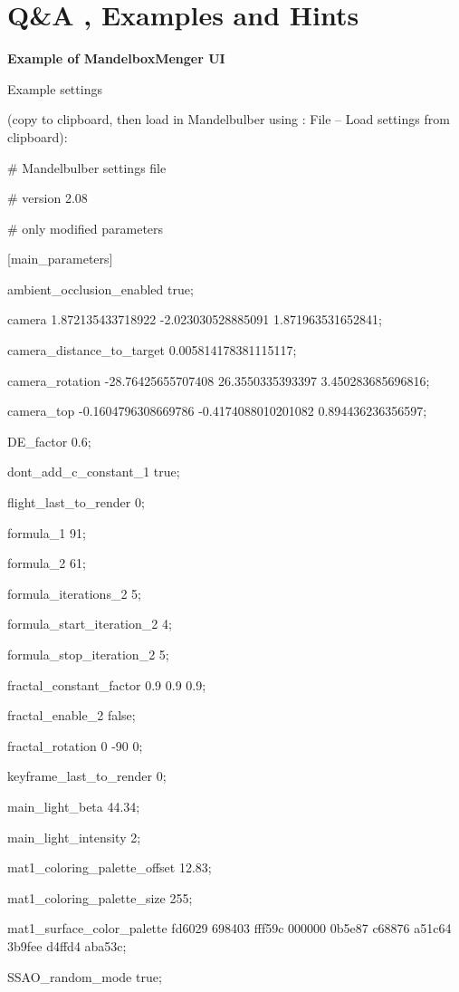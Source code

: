 \section{Q\&A , Examples and Hints}\label{qa-examples-and-hints}

\textbf{Example of MandelboxMenger UI}

Example settings

(copy to clipboard, then load in Mandelbulber using : File -- Load settings from
clipboard):

\# Mandelbulber settings file

\# version 2.08

\# only modified parameters

{[}main\_parameters{]}

ambient\_occlusion\_enabled true;

camera 1.872135433718922 -2.023030528885091 1.871963531652841;

camera\_distance\_to\_target 0.005814178381115117;

camera\_rotation -28.76425655707408 26.3550335393397 3.450283685696816;

camera\_top -0.1604796308669786 -0.4174088010201082 0.894436236356597;

DE\_factor 0.6;

dont\_add\_c\_constant\_1 true;

flight\_last\_to\_render 0;

formula\_1 91;

formula\_2 61;

formula\_iterations\_2 5;

formula\_start\_iteration\_2 4;

formula\_stop\_iteration\_2 5;

fractal\_constant\_factor 0.9 0.9 0.9;

fractal\_enable\_2 false;

fractal\_rotation 0 -90 0;

keyframe\_last\_to\_render 0;

main\_light\_beta 44.34;

main\_light\_intensity 2;

mat1\_coloring\_palette\_offset 12.83;

mat1\_coloring\_palette\_size 255;

mat1\_surface\_color\_palette fd6029 698403 fff59c 000000 0b5e87 c68876 a51c64
3b9fee d4ffd4 aba53c;

SSAO\_random\_mode true;


